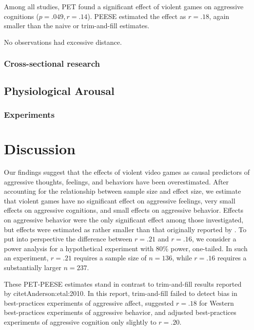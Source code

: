 \documentclass[man]{apa6}
\begin{document}
Among all studies, PET found a significant effect of violent games on aggressive cognitions ($p = .049, r = .14$). PEESE estimated the effect as $r = .18$, again smaller than the naive or trim-and-fill estimates. 

No observations had excessive distance. 

\subsubsection{Cross-sectional research}


\subsection{Physiological Arousal}
\subsubsection{Experiments}

\section{Discussion}
Our findings suggest that the effects of violent video games as causal predictors of aggressive thoughts, feelings, and behaviors have been overestimated. After accounting for the relationship between sample size and effect size, we estimate that violent games have no significant effect on aggressive feelings, very small effects on aggressive cognitions, and small effects on aggressive behavior. Effects on aggressive behavior were the only significant effect among those investigated, but effects were estimated as rather smaller than that originally reported by \citet{Anderson:etal:2010}. To put into perspective the difference between $r = .21$ and $r = .16$, we consider a power analysis for a hypothetical experiment with 80\% power, one-tailed. In such an experiment, $r = .21$ requires a sample size of $n = 136$, while $r = .16$ requires a substantially larger $n = 237$. %



These PET-PEESE estimates stand in contrast to trim-and-fill results reported by citet{Anderson:etal:2010}. In this report, trim-and-fill failed to detect bias in best-practices experiments of aggressive affect, suggested $r = .18$ for Western best-practices experiments of aggressive behavior, and adjusted best-practices experiments of aggressive cognition only slightly to $r = .20$.
\end{document}
